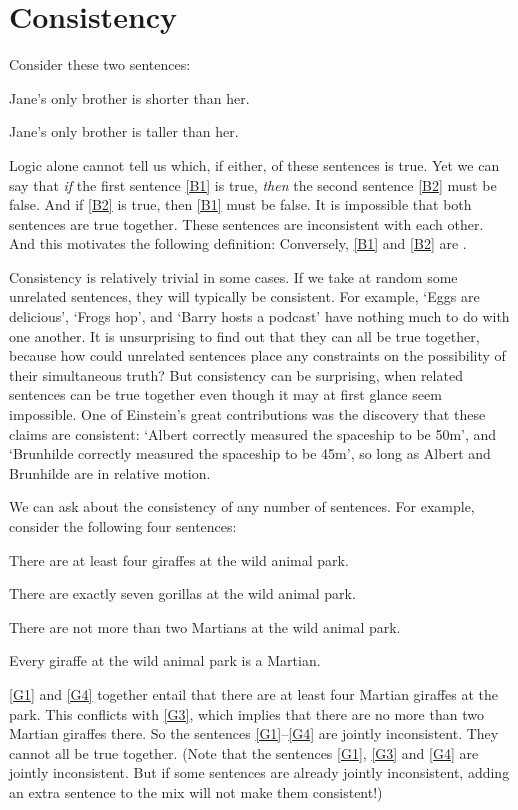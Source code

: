 \section{Consistency}
Consider these two sentences:
	\begin{earg}
		\item[\ex{B1}] Jane's only brother is shorter than her.
		\item[\ex{B2}] Jane's only brother is taller than her.
	\end{earg}
Logic alone cannot tell us which, if either, of these sentences is true. Yet we can say that \emph{if} the first sentence \ref{B1} is true, \emph{then} the second sentence \ref{B2} must be false. And if \ref{B2} is true, then \ref{B1} must be false. It is impossible that both sentences are true together. These sentences are inconsistent with each other. And this motivates the following definition:
Conversely, \ref{B1} and \ref{B2} are .

Consistency is relatively trivial in some cases. If we take at random some unrelated sentences, they will typically be consistent. For example, ‘Eggs are delicious’, ‘Frogs hop’, and ‘Barry hosts a podcast’ have nothing much to do with one another. It is unsurprising to find out that they can all be true together, because how could unrelated sentences place any constraints on the possibility of their simultaneous truth? But consistency can be surprising, when related sentences can be true together even though it may at first glance seem impossible. One of Einstein's great contributions was the discovery  that these claims are consistent: ‘Albert correctly measured the spaceship to be 50m’, and ‘Brunhilde correctly measured the spaceship to be 45m’, so long as Albert and Brunhilde are in relative motion.

We can ask about the consistency of any number of sentences. For example, consider the following four sentences:
	\label{MartianGiraffes}
	\begin{earg}
		\item[\ex{G1}] There are at least four giraffes at the wild animal park.
		\item[\ex{G2}] There are exactly seven gorillas at the wild animal park.
		\item[\ex{G3}] There are not more than two Martians at the wild animal park.
		\item[\ex{G4}] Every giraffe at the wild animal park is a Martian.
	\end{earg}
\ref{G1} and \ref{G4} together entail that there are at least four Martian giraffes at the park. This conflicts with \ref{G3}, which implies that there are no more than two Martian giraffes there. So the sentences \ref{G1}–\ref{G4} are jointly inconsistent. They cannot all be true together. (Note that the sentences \ref{G1}, \ref{G3} and \ref{G4} are jointly inconsistent. But if some sentences are already jointly inconsistent, adding an extra sentence to the mix will not make them consistent!)

